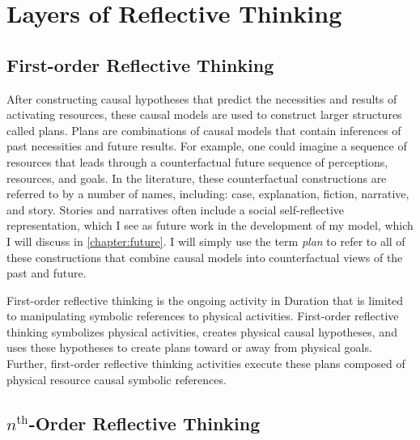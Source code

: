 \chapter{Layers of Reflective Thinking}
\label{chapter:layers_of_reflective_thinking}

\section{First-order Reflective Thinking}

After constructing causal hypotheses that predict the necessities and
results of activating resources, these causal models are used to
construct larger structures called plans.  Plans are combinations of
causal models that contain inferences of past necessities and future
results.  For example, one could imagine a sequence of resources that
leads through a counterfactual future sequence of perceptions,
resources, and goals.  In the literature, these counterfactual
constructions are referred to by a number of names, including: case,
explanation, fiction, narrative, and story.  Stories and narratives
often include a social self-reflective representation, which I see as
future work in the development of my model, which I will discuss in
\autoref{chapter:future}.  I will simply use the term \emph{plan} to
refer to all of these constructions that combine causal models into
counterfactual views of the past and future.

First-order reflective thinking is the ongoing activity in Duration
that is limited to manipulating symbolic references to physical
activities.  First-order reflective thinking symbolizes physical
activities, creates physical causal hypotheses, and uses these
hypotheses to create plans toward or away from physical goals.
Further, first-order reflective thinking activities execute these
plans composed of physical resource causal symbolic references.

\section{$n^\text{th}$-Order Reflective Thinking}

